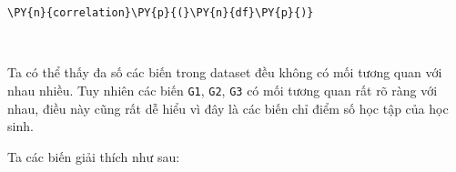     \begin{tcolorbox}[breakable, size=fbox, boxrule=1pt, pad at break*=1mm,colback=cellbackground, colframe=cellborder]
\begin{Verbatim}[commandchars=\\\{\}]
\PY{n}{correlation}\PY{p}{(}\PY{n}{df}\PY{p}{)}
\end{Verbatim}
\end{tcolorbox}

    \begin{center}
    \end{center}
    { \hspace*{\fill} \\}
    
    Ta có thể thấy đa số các biến trong dataset đều không có mối tương quan
với nhau nhiều. Tuy nhiên các biến \texttt{G1}, \texttt{G2}, \texttt{G3}
có mối tương quan rất rõ ràng với nhau, điều này cũng rất dễ hiểu vì đây
là các biến chỉ điểm số học tập của học sinh.

Ta các biến giải thích như sau:

